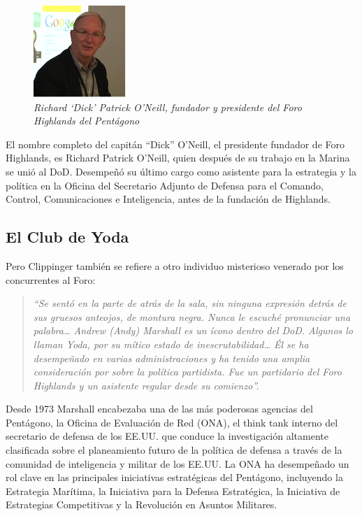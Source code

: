 \documentclass[10pt,a5paper,twoside,spanish,]{book}
\begin{document}
\begin{figure}[htbp]
\centering
\includegraphics{1.2.png}
\caption{\emph{Richard `Dick' Patrick O'Neill, fundador y presidente del
Foro Highlands del Pentágono}}
\end{figure}

El nombre completo del capitán ``Dick'' O'Neill, el presidente fundador
de Foro Highlands, es Richard Patrick O'Neill, quien después de su
trabajo en la Marina se unió al DoD. Desempeñó su último cargo como
asistente para la estrategia y la política en la Oficina del Secretario
Adjunto de Defensa para el Comando, Control, Comunicaciones e
Inteligencia, antes de la fundación de Highlands.

\subsection{El Club de Yoda}\label{el-club-de-yoda}

Pero Clippinger también se refiere a otro individuo misterioso venerado
por los concurrentes al Foro:

\begin{quote}
\emph{``Se sentó en la parte de atrás de la sala, sin ninguna expresión
detrás de sus gruesos anteojos, de montura negra. Nunca le escuché
pronunciar una palabra\ldots{} Andrew (Andy) Marshall es un ícono dentro
del DoD. Algunos lo llaman Yoda, por su mítico estado de
inescrutabilidad\ldots{} Él se ha desempeñado en varias administraciones
y ha tenido una amplia consideración por sobre la política partidista.
Fue un partidario del Foro Highlands y un asistente regular desde su
comienzo''.}
\end{quote}

Desde 1973 Marshall encabezaba una de las más poderosas agencias del
Pentágono, la Oficina de Evaluación de Red (ONA), el think tank interno
del secretario de defensa de los EE.UU. que conduce la investigación
altamente clasificada sobre el planeamiento futuro de la política de
defensa a través de la comunidad de inteligencia y militar de los EE.UU.
La ONA ha desempeñado un rol clave en las principales iniciativas
estratégicas del Pentágono, incluyendo la Estrategia Marítima, la
Iniciativa para la Defensa Estratégica, la Iniciativa de Estrategias
Competitivas y la Revolución en Asuntos Militares.
\end{document}
